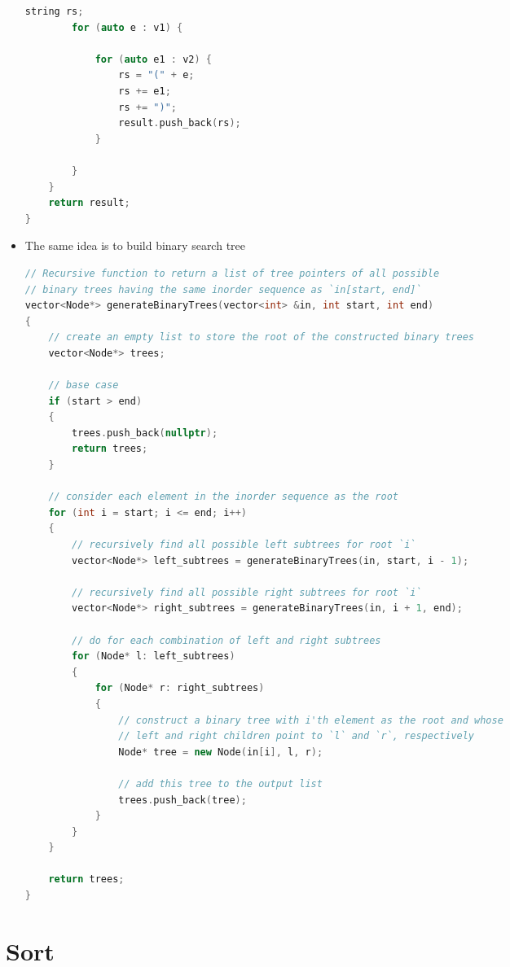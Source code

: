 \documentclass[a4paper,11pt,twoside]{book}
\begin{document}
\begin{itemize}
\begin{lstlisting}[frame=single, language=c++]
		string rs;
		for (auto e : v1) {
			
			for (auto e1 : v2) {
				rs = "(" + e;
				rs += e1;
				rs += ")";
				result.push_back(rs);
			}
			
		}
	}
	return result;
}
\end{lstlisting}

\item The same idea is to build binary search tree

\begin{lstlisting}[frame=single, language=c++]
// Recursive function to return a list of tree pointers of all possible
// binary trees having the same inorder sequence as `in[start, end]`
vector<Node*> generateBinaryTrees(vector<int> &in, int start, int end)
{
	// create an empty list to store the root of the constructed binary trees
	vector<Node*> trees;
	
	// base case
	if (start > end)
	{
		trees.push_back(nullptr);
		return trees;
	}
	
	// consider each element in the inorder sequence as the root
	for (int i = start; i <= end; i++)
	{
		// recursively find all possible left subtrees for root `i`
		vector<Node*> left_subtrees = generateBinaryTrees(in, start, i - 1);
		
		// recursively find all possible right subtrees for root `i`
		vector<Node*> right_subtrees = generateBinaryTrees(in, i + 1, end);
		
		// do for each combination of left and right subtrees
		for (Node* l: left_subtrees)
		{
			for (Node* r: right_subtrees)
			{
				// construct a binary tree with i'th element as the root and whose
				// left and right children point to `l` and `r`, respectively
				Node* tree = new Node(in[i], l, r);
				
				// add this tree to the output list
				trees.push_back(tree);
			}
		}
	}
	
	return trees;
}
\end{lstlisting}


\end{itemize}

\section{Sort}
\end{document}
